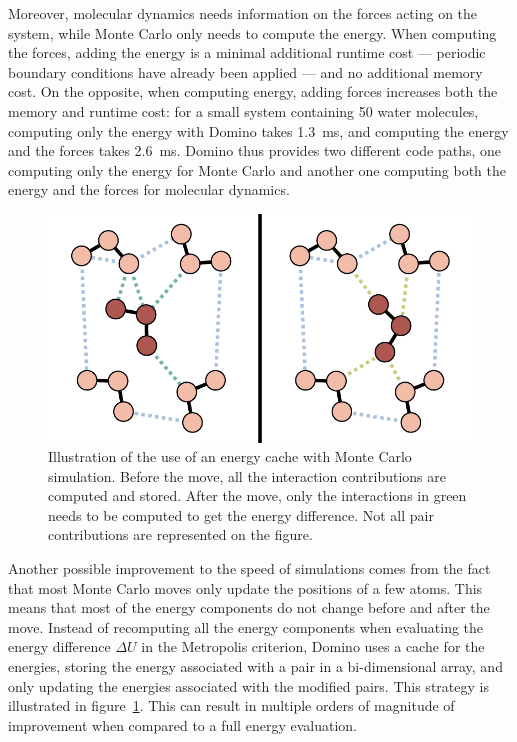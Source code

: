 \documentclass[thesis]{subfiles}
\begin{document}
Moreover, molecular dynamics needs information on the forces acting on the
system, while Monte Carlo only needs to compute the energy. When computing the
forces, adding the energy is a minimal additional runtime cost --- periodic
boundary conditions have already been applied --- and no additional memory cost.
On the opposite, when computing energy, adding forces increases both the memory
and runtime cost: for a small system containing 50 water molecules, computing
only the energy with Domino takes \SI{1.3}{ms}, and computing the energy and the
forces takes \SI{2.6}{ms}. Domino thus provides two different code paths, one
computing only the energy for Monte Carlo and another one computing both the
energy and the forces for molecular dynamics.

\begin{figure}[ht]
    \centering
    \includegraphics[width=.7\textwidth]{figures/images/mc-cache}
    \caption{Illustration of the use of an energy cache with Monte Carlo
    simulation. Before the move, all the interaction contributions are computed
    and stored. After the move, only the interactions in green needs to be
    computed to get the energy difference. Not all pair contributions are
    represented on the figure.}
    \label{fig:mc-cache}
\end{figure}

Another possible improvement to the speed of simulations comes from the fact
that most Monte Carlo moves only update the positions of a few atoms. This
means that most of the energy components do not change before and after the
move. Instead of recomputing all the energy components when evaluating the
energy difference $\Delta U$ in the Metropolis criterion, Domino uses a cache
for the energies, storing the energy associated with a pair in a bi-dimensional
array, and only updating the energies associated with the modified pairs. This
strategy is illustrated in figure~\ref{fig:mc-cache}. This can result in
multiple orders of magnitude of improvement when compared to a full energy
evaluation.
\end{document}
